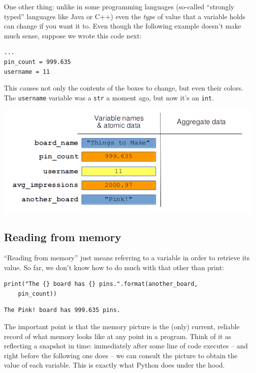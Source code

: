 One other thing: unlike in some programming languages (so-called ``strongly
typed'' languages like Java or C++) even the \textit{type} of value that a
variable holds can change if you want it to. Even though the following example
doesn't make much sense, suppose we wrote this code next:

\begin{Verbatim}[fontsize=\small,samepage=true,frame=single,framesep=3mm]
...
pin_count = 999.635
username = 11
\end{Verbatim}

This causes not only the contents of the boxes to change, but even their
colors. The \texttt{username} variable was a \texttt{str} a moment ago, but now
it's an \texttt{int}.

\vspace{-.2in}
\begin{center}
\includegraphics[width=.7\textwidth]{memoryPicture5.png}
\end{center}

\subsection{Reading from memory}

``Reading from memory'' just means referring to a variable in order to retrieve
its value. So far, we don't know how to do much with that other than print:

\begin{Verbatim}[fontsize=\small,samepage=true,frame=single,framesep=3mm]
print("The {} board has {} pins.".format(another_board,
    pin_count))
\end{Verbatim}

\begin{Verbatim}[fontsize=\small,samepage=true,frame=leftline,framesep=5mm,framerule=1mm]
The Pink! board has 999.635 pins.
\end{Verbatim}

The important point is that the memory picture is the (only) current, reliable
record of what memory looks like at any point in a program. Think of it as
reflecting a snapshot in time: immediately after some line of code executes --
and right before the following one does -- we can consult the picture to obtain
the value of each variable. This is exactly what Python does under the hood.

